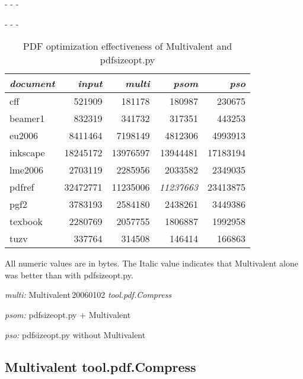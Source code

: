 \documentclass{ltugproc}
\def\cmd{\textsf}
\def\captiontop#1{%
  \advance\abovecaptionskip-\belowcaptionskip
  \advance\belowcaptionskip\abovecaptionskip
  \advance\abovecaptionskip-\belowcaptionskip
  \abovecaptionskip-\abovecaptionskip
  \caption{#1}%
  \advance\abovecaptionskip-\belowcaptionskip
  \advance\belowcaptionskip\abovecaptionskip
  \advance\abovecaptionskip-\belowcaptionskip
  \abovecaptionskip-\abovecaptionskip
}
\begin{document}
\begin{table}
\captiontop{PDF optimization effectiveness
of Multivalent and \cmd{pdfsizeopt.py}}\label{tab:eff-multivalent-pso}
\par\small\noindent\hfil
\advance\tabcolsep-2pt  %
\begin{tabular*}{\hsize}{@{\extracolsep{\fill}}lrrrr@{}}
\toprule
\emph{document} & \emph{input} & \emph{multi} & \emph{psom} & \emph{pso} \\\midrule
cff         &   521909 &    181178 &    180987 &   230675 \\
beamer1     &   832319 &    341732 &    317351 &   443253 \\
eu2006      &  8411464 &   7198149 &   4812306 &  4993913 \\
inkscape    & 18245172 &  13976597 &  13944481 & 17183194 \\
lme2006     &  2703119 &   2285956 &   2033582 &  2349035 \\
pdfref      & 32472771 &  11235006 &  \emph{11237663} & 23413875 \\
pgf2        &  3783193 &   2584180 &   2438261 &  3449386 \\
texbook     &  2280769 &   2057755 &   1806887 &  1992958 \\
tuzv        &   337764 &    314508 &    146414 &   166863 \\
\bottomrule
\end{tabular*}
\par\bigskip
\par\noindent All numeric values are in bytes.
The Italic value indicates that Multivalent alone was better than with
\cmd{pdfsizeopt.py}.
\par\noindent\emph{multi:} Multivalent\,20060102 \emph{tool.pdf.Compress}
\par\noindent\emph{psom:} \cmd{pdfsizeopt.py} $+$ Multivalent
\par\noindent\emph{pso:} \cmd{pdfsizeopt.py} without Multivalent
\end{table}

\subsection{Multivalent tool.pdf.Compress}
\end{document}
